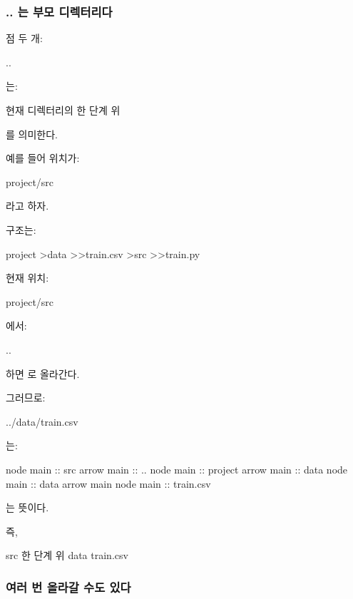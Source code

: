 \subsubsection{.. 는 부모 디렉터리다}

점 두 개:

\begin{dhkzsh}
..
\end{dhkzsh}

는:

\begin{dhksmry}[centered]
현재 디렉터리의 한 단계 위
\end{dhksmry}

를 의미한다.

예를 들어 위치가:

\begin{dhkzsh}
project/src
\end{dhkzsh}

라고 하자.

구조는:

\begin{dhkdir}
project
>data
>>train.csv
>src
>>train.py
\end{dhkdir}

현재 위치:

\begin{dhkzsh}
project/src
\end{dhkzsh}

에서:

\begin{dhkzsh}
..
\end{dhkzsh}

하면 로 올라간다.

그러므로:

\begin{dhkzsh}
../data/train.csv
\end{dhkzsh}

는:

\begin{dhkbranch}[in=14]
node main :: src
arrow main :: ..
node main :: project
arrow main :: data
node main :: data
arrow main
node main :: train.csv
\end{dhkbranch}

는 뜻이다.

즉,

\begin{dhksmry}[centered]
src \ra 한 단계 위 \ra data \ra train.csv
\end{dhksmry}

\subsubsection{여러 번 올라갈 수도 있다}

